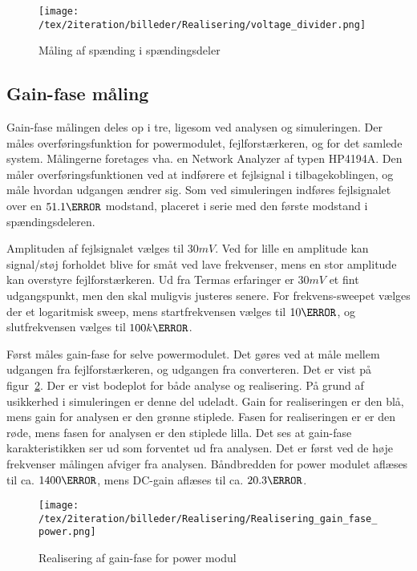 \begin{figure}[H]
	\center
	\texttt{[image: /tex/2iteration/billeder/Realisering/voltage\_divider.png]}
	\caption{Måling af spænding i spændingsdeler}
	\label{fig:voltage_divider_realisering}
\end{figure}

\subsection{Gain-fase måling} \label{gain_fase_2}
Gain-fase målingen deles op i tre, ligesom ved analysen og simuleringen. Der måles overføringsfunktion for powermodulet, fejlforstærkeren, og for det samlede system. Målingerne foretages vha. en Network Analyzer af typen HP4194A. Den måler overføringsfunktionen ved at indførere et fejlsignal i tilbagekoblingen, og måle hvordan udgangen ændrer sig. Som ved simuleringen indføres fejlsignalet over en $51.1\ohm$ modstand, placeret i serie med den første modstand i spændingsdeleren. 

Amplituden af fejlsignalet vælges til $30mV$. Ved for lille en amplitude kan signal/støj forholdet blive for småt ved lave frekvenser, mens en stor amplitude kan overstyre fejlforstærkeren. Ud fra Termas erfaringer er $30mV$ et fint udgangspunkt, men den skal muligvis justeres senere. For frekvens-sweepet vælges der et logaritmisk sweep, mens startfrekvensen vælges til $10\hertz$, og slutfrekvensen vælges til $100k\hertz$. 

Først måles gain-fase for selve powermodulet. Det gøres ved at måle mellem udgangen fra fejlforstærkeren, og udgangen fra converteren. Det er vist på figur~\ref{fig:realisering_gain_fase_power}. Der er vist bodeplot for både analyse og realisering. På grund af usikkerhed i simuleringen er denne del udeladt. Gain for realiseringen er den blå, mens gain for analysen er den grønne stiplede. Fasen for realiseringen er er den røde, mens fasen for analysen er den stiplede lilla. Det ses at gain-fase karakteristikken ser ud som forventet ud fra analysen. Det er først ved de høje frekvenser målingen afviger fra analysen. Båndbredden for power modulet aflæses til ca. $1400\hertz$, mens DC-gain aflæses til ca. $20.3\decibel$.

\begin{figure}[H]
	\center
	\texttt{[image: /tex/2iteration/billeder/Realisering/Realisering\_gain\_fase\_power.png]}
	\caption{Realisering af gain-fase for power modul}
	\label{fig:realisering_gain_fase_power}
\end{figure}

